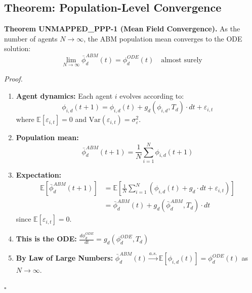 \subsection{Theorem: Population-Level Convergence}

\begin{tcolorbox}[colback=green!5!white, colframe=green!75!black, title=Theorem UNMAPPED_PPP-1: Mean Field Convergence]
\textbf{Theorem UNMAPPED_PPP-1 (Mean Field Convergence).}
As the number of agents $N \to \infty$, the ABM population mean converges to the ODE solution:
\begin{equation}
\lim_{N \to \infty} \bar{\phi}^{ABM}_d(t) = \phi^{ODE}_d(t) \quad \text{almost surely}
\label{eq:ppp-mean-field}
\end{equation}

\textit{Proof.}
\begin{enumerate}
\item \textbf{Agent dynamics:} Each agent $i$ evolves according to:
\begin{equation}
\phi_{i,d}(t+1) = \phi_{i,d}(t) + g_d(\phi_{i,d}, T_d) \cdot dt + \varepsilon_{i,t}
\end{equation}
where $\mathbb{E}[\varepsilon_{i,t}] = 0$ and $\text{Var}(\varepsilon_{i,t}) = \sigma^2_\varepsilon$.

\item \textbf{Population mean:}
\begin{equation}
\bar{\phi}^{ABM}_d(t+1) = \frac{1}{N} \sum_{i=1}^{N} \phi_{i,d}(t+1)
\end{equation}

\item \textbf{Expectation:}
\begin{align}
\mathbb{E}[\bar{\phi}^{ABM}_d(t+1)] &= \mathbb{E}\left[\frac{1}{N} \sum_{i=1}^{N} \left(\phi_{i,d}(t) + g_d \cdot dt + \varepsilon_{i,t}\right)\right] \\
&= \bar{\phi}^{ABM}_d(t) + g_d(\bar{\phi}^{ABM}_d, T_d) \cdot dt
\end{align}
since $\mathbb{E}[\varepsilon_{i,t}] = 0$.

\item \textbf{This is the ODE:} $\frac{d\phi^{ODE}_d}{dt} = g_d(\phi^{ODE}_d, T_d)$

\item \textbf{By Law of Large Numbers:} $\bar{\phi}^{ABM}_d(t) \xrightarrow{a.s.} \mathbb{E}[\phi_{i,d}(t)] = \phi^{ODE}_d(t)$ as $N \to \infty$.
\end{enumerate}
\hfill $\square$
\end{tcolorbox}

